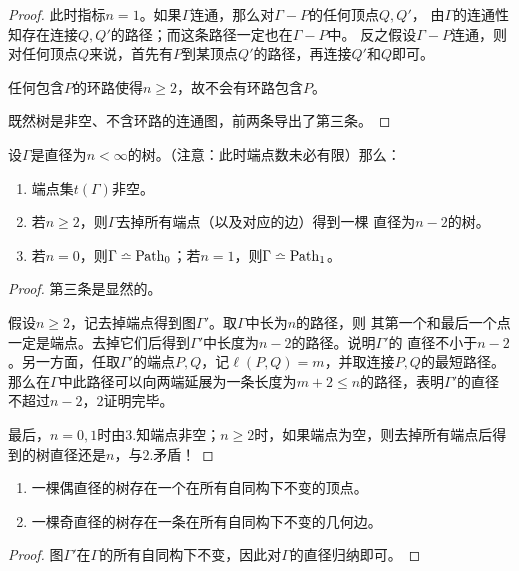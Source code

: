 \begin{proof}
    此时指标$n = 1$。如果$\Gamma$连通，那么对$\Gamma-P$的任何顶点$Q,Q'$，
    由$\Gamma$的连通性知存在连接$Q,Q'$的路径；而这条路径一定也在$\Gamma-P$中。
    反之假设$\Gamma-P$连通，则对任何顶点$Q$来说，首先有$P$到某顶点$Q'$的路径，再连接$Q'$和$Q$即可。

    任何包含$P$的环路使得$n \geqslant 2$，故不会有环路包含$P$。

    既然树是非空、不含环路的连通图，前两条导出了第三条。
\end{proof}
\begin{proposition}
    设$\Gamma$是直径为$n<\infty$的树。（注意：此时端点数未必有限）那么：
    \begin{enumerate}
        \item 端点集$t(\Gamma)$非空。
        \item 若$n \geqslant 2$，则$\Gamma$去掉所有端点（以及对应的边）得到一棵
        直径为$n-2$的树。
        \item 若$n = 0$，则$\Gamma \bumpeq \operatorname{Path}_0$；若$n = 1$，则$\Gamma \bumpeq \operatorname{Path}_1$。
    \end{enumerate}
\end{proposition}
\begin{proof}
第三条是显然的。

假设$n \geqslant 2$，记去掉端点得到图$\Gamma'$。取$\Gamma$中长为$n$的路径，则
其第一个和最后一个点一定是端点。去掉它们后得到$\Gamma'$中长度为$n-2$的路径。说明$\Gamma'$的
直径不小于$n-2$。另一方面，任取$\Gamma'$的端点$P,Q$，记$\ell(P,Q) = m$，并取连接$P,Q$的最短路径。
那么在$\Gamma$中此路径可以向两端延展为一条长度为$m+2 \leqslant n$的路径，表明$\Gamma'$的直径
不超过$n-2$，$2$证明完毕。

最后，$n = 0,1$时由$3.$知端点非空；$n \geqslant 2$时，如果端点为空，则去掉所有端点后得到的树直径还是$n$，与$2.$矛盾！
\end{proof}
\begin{corollary}
    \begin{enumerate}\label{coro-tree-inv}
        \item 一棵偶直径的树存在一个在所有自同构下不变的顶点。
        \item 一棵奇直径的树存在一条在所有自同构下不变的几何边。
    \end{enumerate}
\end{corollary}
\begin{proof}
    图$\Gamma'$在$\Gamma$的所有自同构下不变，因此对$\Gamma$的直径归纳即可。
\end{proof}
